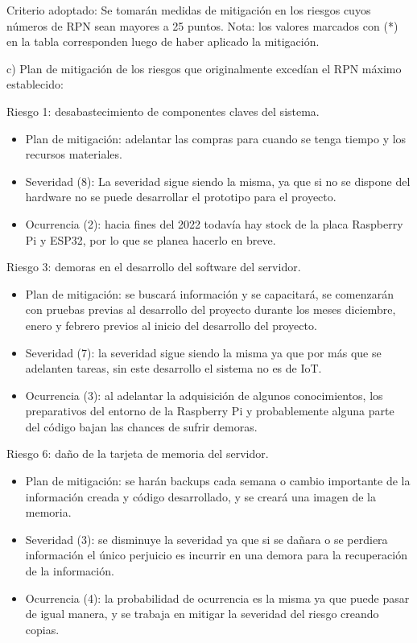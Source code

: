 \documentclass[
11pt, %
]{charter}
\begin{document}
Criterio adoptado: 
Se tomarán medidas de mitigación en los riesgos cuyos números de RPN sean mayores a 25 puntos.
Nota: los valores marcados con (*) en la tabla corresponden luego de haber aplicado la mitigación.

c) Plan de mitigación de los riesgos que originalmente excedían el RPN máximo establecido:
 
Riesgo 1: desabastecimiento de componentes claves del sistema.
\begin{itemize}
	\item Plan de mitigación: adelantar las compras para cuando se tenga tiempo y los recursos materiales.
	\item Severidad (8): La severidad sigue siendo la misma, ya que si no se dispone del hardware no se puede desarrollar el prototipo para el proyecto.
	\item Ocurrencia (2): hacia fines del 2022 todavía hay stock de la placa Raspberry Pi y ESP32, por lo que se planea hacerlo en breve.
\end{itemize}
  
Riesgo 3: demoras en el desarrollo del software del servidor.
\begin{itemize}
	\item Plan de mitigación: se buscará información y se capacitará, se comenzarán con pruebas previas al desarrollo del proyecto durante los meses diciembre, enero y febrero previos al inicio del desarrollo del proyecto.
	\item Severidad (7): la severidad sigue siendo la misma ya que por más que se adelanten tareas, sin este desarrollo el sistema no es de IoT.
	\item Ocurrencia (3): al adelantar la adquisición de algunos conocimientos, los preparativos del entorno de la Raspberry Pi y probablemente alguna parte del código bajan las chances de sufrir demoras.
\end{itemize}

Riesgo 6: daño de la tarjeta de memoria del servidor.
\begin{itemize}
	\item Plan de mitigación: se harán backups cada semana o cambio importante de la información creada y código desarrollado, y se creará una imagen de la memoria.
	\item Severidad (3): se disminuye la severidad ya que si se dañara o se perdiera información el único perjuicio es incurrir en una demora para la recuperación de la información.
	\item Ocurrencia (4): la probabilidad de ocurrencia es la misma ya que puede pasar de igual manera, y se trabaja en mitigar la severidad del riesgo creando copias.
\end{itemize}
\end{document}
